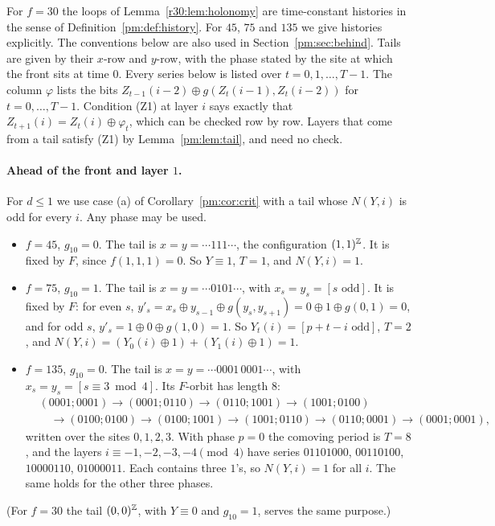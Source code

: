For $f=30$ the loops of Lemma~\ref{r30:lem:holonomy} are time-constant histories in the sense of Definition~\ref{pm:def:history}. For $45$, $75$ and $135$ we give histories explicitly. The conventions below are also used in Section~\ref{pm:sec:behind}. Tails are given by their $x$-row and $y$-row, with the phase stated by the site at which the front sits at time $0$. Every series below is listed over $t=0,1,\dots,T-1$. The column $\varphi$ lists the bits $Z_{t-1}(i-2)\oplus g(Z_t(i-1),Z_t(i-2))$ for $t=0,\dots,T-1$. Condition (Z1) at layer $i$ says exactly that $Z_{t+1}(i)=Z_t(i)\oplus\varphi_t$, which can be checked row by row. Layers that come from a tail satisfy (Z1) by Lemma~\ref{pm:lem:tail}, and need no check.

\paragraph{Ahead of the front and layer $1$.} For $d\le1$ we use case (a) of Corollary~\ref{pm:cor:crit} with a tail whose $N(Y,i)$ is odd for every $i$. Any phase may be used.
\begin{itemize}
\item $f=45$, $g_{10}=0$. The tail is $x=y=\cdots111\cdots$, the configuration $(1,1)^{\mathbb{Z}}$. It is fixed by $F$, since $f(1,1,1)=0$. So $Y\equiv1$, $T=1$, and $N(Y,i)=1$.
\item $f=75$, $g_{10}=1$. The tail is $x=y=\cdots0101\cdots$, with $x_s=y_s=[s\text{ odd}]$. It is fixed by $F$: for even $s$, $y'_s=x_s\oplus y_{s-1}\oplus g(y_s,y_{s+1})=0\oplus1\oplus g(0,1)=0$, and for odd $s$, $y'_s=1\oplus0\oplus g(1,0)=1$. So $Y_t(i)=[p+t-i\text{ odd}]$, $T=2$, and $N(Y,i)=(Y_0(i)\oplus1)+(Y_1(i)\oplus1)=1$.
\item $f=135$, $g_{10}=0$. The tail is $x=y=\cdots0001\,0001\cdots$, with $x_s=y_s=[s\equiv3\bmod4]$. Its $F$-orbit has length $8$:
\begin{align*}
&(0001;0001)\to(0001;0110)\to(0110;1001)\to(1001;0100)\\
&\quad\to(0100;0100)\to(0100;1001)\to(1001;0110)\to(0110;0001)\to(0001;0001),
\end{align*}
written over the sites $0,1,2,3$. With phase $p=0$ the comoving period is $T=8$, and the layers $i\equiv-1,-2,-3,-4\pmod4$ have series $01101000$, $00110100$, $10000110$, $01000011$. Each contains three $1$'s, so $N(Y,i)=1$ for all $i$. The same holds for the other three phases.
\end{itemize}
(For $f=30$ the tail $(0,0)^{\mathbb{Z}}$, with $Y\equiv0$ and $g_{10}=1$, serves the same purpose.)

